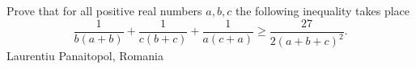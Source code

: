 Prove that for all positive real numbers $a,b,c$ the following inequality takes place\[ \frac{1}{b(a+b)}+ \frac{1}{c(b+c)}+ \frac{1}{a(c+a)} \geq \frac{27}{2(a+b+c)^2} . \]Laurentiu Panaitopol, Romania